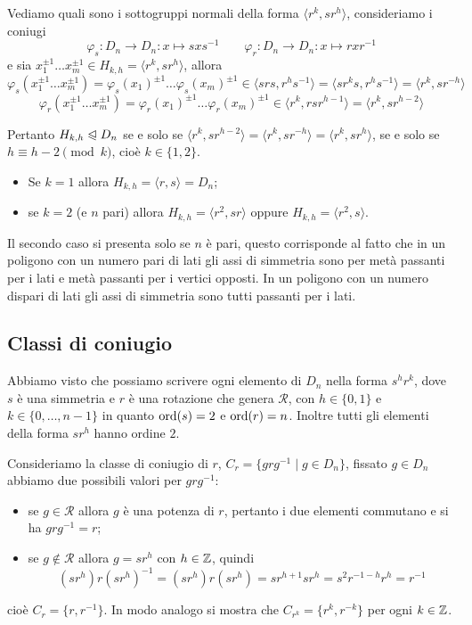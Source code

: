 \documentclass[11pt]{scrartcl}
\begin{document}
Vediamo quali sono i sottogruppi normali della forma 
$\langle r^k, sr^h\rangle$, consideriamo i coniugi \[
    \varphi_s: D_n \longrightarrow D_n :x \longmapsto sxs^{-1}\qquad
    \varphi_r: D_n \longrightarrow D_n :x \longmapsto rxr^{-1}
\]e sia $x_1^{\pm 1}\ldots x_m^{\pm 1} \in H_{k, h} = \langle r^k, sr^h\rangle$, allora
\[
    \varphi_s(x_1^{\pm 1}\ldots x_m^{\pm 1}) = \varphi_s(x_1)^{\pm 1}\ldots \varphi_s(x_m)^{\pm 1}
    \in \langle srs, r^hs^{-1}\rangle = \langle sr^ks, r^hs^{-1}\rangle = \langle
    r^k, sr^{-h}\rangle
\]
\[
    \varphi_r(x_1^{\pm 1}\ldots x_m^{\pm 1}) = \varphi_r(x_1)^{\pm 1}\ldots \varphi_r(x_m)^{\pm 1}
    \in \langle r^k, rsr^{h - 1}\rangle = \langle r^k, sr^{h - 2}\rangle
\]

Pertanto $H_{k, h}\trianglelefteqslant D_n$ se e solo se $\langle r^k, sr^{h - 2}\rangle
= \langle r^k, sr^{-h}\rangle = \langle r^k, sr^h\rangle$, se e solo se 
$h \equiv h - 2 \pmod k$, cioè $k \in \{1, 2\}$.\begin{itemize}
    \item Se $k = 1$ allora $H_{k, h} = \langle r, s\rangle = D_n$;
    \item se $k = 2$ (e $n$ pari) allora $H_{k, h} = \langle r^2, sr\rangle$ oppure 
    $H_{k, h} = \langle r^2, s\rangle$.
\end{itemize}

\begin{remark}
    Il secondo caso si presenta solo se $n$ è pari, questo corrisponde al fatto 
    che in un poligono con un numero pari di lati gli assi di simmetria sono 
    per metà passanti per i lati e metà passanti per i vertici opposti. In un poligono con un numero dispari
    di lati gli assi di simmetria sono tutti passanti per i lati.
\end{remark}


\subsection{Classi di coniugio}

Abbiamo visto che possiamo scrivere ogni elemento di $D_n$ nella forma
 $s^hr^k$, dove $s$ è una simmetria e $r$ è una rotazione che genera 
 $\mathcal{R}$, con $h \in \{0, 1\}$ e $k \in \{0, \ldots, n - 1\}$
in quanto $\operatorname{ord}(s)= 2$ e $\operatorname{ord}(r) = n$. Inoltre tutti gli elementi della
forma $sr^h$ hanno ordine $2$.

Consideriamo la classe di coniugio di $r$, $C_r = \{grg^{-1}\mid g \in D_n\}$,
fissato $g \in D_n$ abbiamo due possibili valori per $grg^{-1}$:
\begin{itemize}
    \item se $g \in \mathcal{R}$ allora $g$ è una potenza di $r$, pertanto i
    due elementi commutano e si ha $grg^{-1} = r$;
    \item se $g\notin\mathcal{R}$ allora $g = sr^h$ con $h \in \mathbb Z$, quindi
    \[
        (sr^h)r(sr^h)^{-1} = (sr^h)r(sr^h) = sr^{h + 1}sr^h = s^2r^{-1-h}r^h = r^{-1}
    \]
\end{itemize}
cioè $C_r = \{r, r^{-1}\}$. In modo analogo si mostra che $C_{r^k} = \{r^k, r^{-k}\}$
per ogni $k \in \mathbb Z$.
\end{document}
